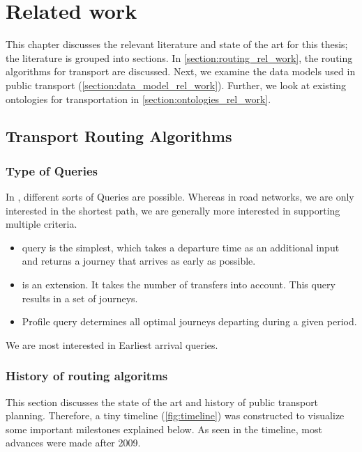 \chapter{Related work}
\label{chap:rel_work}
This chapter discusses the relevant literature and state of the art for this thesis; the literature is grouped into  sections. In \autoref{section:routing_rel_work}, the routing algorithms for transport are discussed. Next, we examine the data models used in public transport (\autoref{section:data_model_rel_work}). Further, we look at existing ontologies for transportation in \autoref{section:ontologies_rel_work}.

\section{Transport Routing Algorithms }\label{section:routing_rel_work}

\subsection{Type of Queries}
In , different sorts of Queries are possible. Whereas in road networks, we are only interested in the shortest path, we are generally more interested in supporting multiple criteria. 
\begin{itemize}
    \item {} query is the simplest, which takes a departure time as an additional input and returns a journey that arrives as early as possible.
    \item {} is an extension. It takes the number of transfers into account. This query results in a set of journeys.
    \item Profile query determines all optimal journeys departing during a given period.
\end{itemize}

We are most interested in Earliest arrival queries.
\subsection{History of routing algoritms}


This section discusses the state of the art and history of public transport planning. Therefore, a tiny timeline (\autoref{fig:timeline}) was constructed to visualize some important milestones explained below. As seen in the timeline, most advances were made after 2009.

